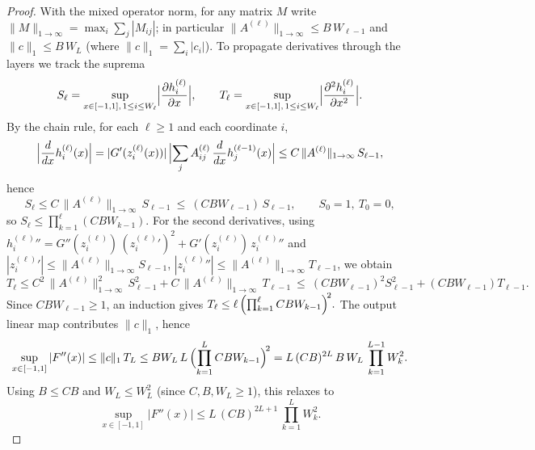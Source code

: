 \documentclass{article}
\theoremstyle{plain}
\theoremstyle{definition}
\theoremstyle{remark}
\begin{document}
\begin{proof}
With the mixed operator norm, for any matrix $M$ write $\|M\|_{1\to\infty}=\max_i\sum_j|M_{ij}|$; in particular $\|A^{(\ell)}\|_{1\to\infty}\le B\,W_{\ell-1}$ and $\|c\|_1\le B\,W_L$ (where $\|c\|_1=\sum_i |c_i|$). To propagate derivatives through the layers we track the suprema
\[
S_\ell=\sup_{x\in[-1,1],\,1\le i\le W_\ell}\Bigl|\frac{\partial h^{(\ell)}_i}{\partial x}\Bigr|,\qquad
T_\ell=\sup_{x\in[-1,1],\,1\le i\le W_\ell}\Bigl|\frac{\partial^2 h^{(\ell)}_i}{\partial x^2}\Bigr|.
\]
By the chain rule, for each $\ell\ge1$ and each coordinate $i$,
\[
\Bigl|\frac{d}{dx}h^{(\ell)}_i(x)\Bigr|
=|G'(z^{(\ell)}_i(x))|\,\Bigl|\sum_j A^{(\ell)}_{ij}\,\frac{d}{dx}h^{(\ell-1)}_j(x)\Bigr|
\le C\,\|A^{(\ell)}\|_{1\to\infty}\,S_{\ell-1},
\]
hence
\[
S_\ell \le C\,\|A^{(\ell)}\|_{1\to\infty}\,S_{\ell-1}\ \le\ (C B W_{\ell-1})\,S_{\ell-1},\qquad S_0=1,\ T_0=0,
\]
so \(
S_\ell \le \prod_{k=1}^{\ell} (C B W_{k-1}).
\) For the second derivatives, using $h^{(\ell)}_i{}''=G''(z^{(\ell)}_i)\,(z^{(\ell)}_i{}')^2+G'(z^{(\ell)}_i)\,z^{(\ell)}_i{}''$ and
$|z^{(\ell)}_i{}'|\le \|A^{(\ell)}\|_{1\to\infty}S_{\ell-1}$, $|z^{(\ell)}_i{}''|\le \|A^{(\ell)}\|_{1\to\infty}T_{\ell-1}$, we obtain
\[
T_\ell \le C^2\,\|A^{(\ell)}\|_{1\to\infty}^2\,S_{\ell-1}^2 + C\,\|A^{(\ell)}\|_{1\to\infty}\,T_{\ell-1}
\ \le\ (C B W_{\ell-1})^2 S_{\ell-1}^2 + (C B W_{\ell-1}) T_{\ell-1}.
\]
Since $C B W_{\ell-1}\ge1$, an induction gives \(
T_\ell \le \ell\,\Bigl(\prod_{k=1}^{\ell} C B W_{k-1}\Bigr)^{\!2}.
\) The output linear map contributes $\|c\|_1$, hence
\[
\sup_{x\in[-1,1]}|F''(x)| \le \|c\|_1\,T_L \le B W_L \, L\,\Bigl(\prod_{k=1}^{L} C B W_{k-1}\Bigr)^{\!2}
= L\,(C B)^{2L}\,B\,W_L\,\prod_{k=1}^{L-1} W_k^{2}.
\]
Using $B\le C B$ and $W_L\le W_L^2$ (since $C,B,W_L\ge1$), this relaxes to
\begin{equation}\label{eq:Fpp}
\sup_{x\in[-1,1]}|F''(x)| \le L\,(C B)^{2L+1}\,\prod_{k=1}^{L} W_k^{2}.
\end{equation}


\end{proof}
\end{document}
